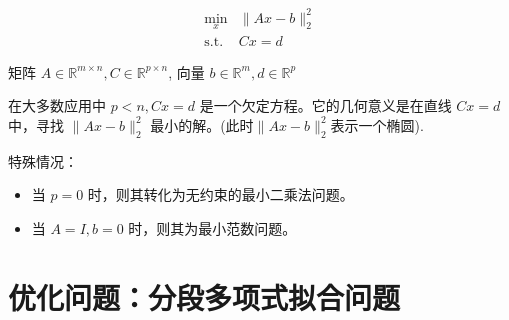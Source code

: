 \begin{problem}[分段多项式拟合问题]
    \begin{equation}\begin{aligned}
        \min _{x} &\|A x-b\|_{2}^{2} \\
        \text{s.t.} & Cx =d 
    \end{aligned}\end{equation}

    矩阵 $ {A} \in \mathbb{R}^{m \times n}, {C} \in \mathbb{R}^{p \times n} $, 向量 $ {b} \in \mathbb{R}^{m}, d \in \mathbb{R}^{p} $
\end{problem}



在大多数应用中 $ p<n, C x=d $ 是一个欠定方程。它的几何意义是在直线 $ C x=d $ 中，寻找 $ \|A x-b\|_{2}^{2} $ 最小的解。(此时$\|A x-b\|_{2}^{2}$表示一个椭圆).

特殊情况：

\begin{itemize}
    \item 当 $ {p}=0 $ 时，则其转化为无约束的最小二乘法问题。
    \item 当 $ {A}=I, b=0 $ 时，则其为最小范数问题。
\end{itemize}




\section{优化问题：分段多项式拟合问题}

